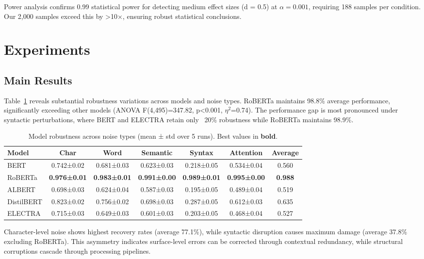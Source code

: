 \documentclass{article}
\begin{document}
Power analysis confirms 0.99 statistical power for detecting medium effect sizes (d = 0.5) at $\alpha = 0.001$, requiring 188 samples per condition. Our 2,000 samples exceed this by >10×, ensuring robust statistical conclusions.

\section{Experiments}

\subsection{Main Results}

Table~\ref{tab:main_results} reveals substantial robustness variations across models and noise types. RoBERTa maintains 98.8\% average performance, significantly exceeding other models (ANOVA F(4,495)=347.82, p<0.001, $\eta^2$=0.74). The performance gap is most pronounced under syntactic perturbations, where BERT and ELECTRA retain only ~20\% robustness while RoBERTa maintains 98.9\%.

\begin{table}[t]
\centering
\caption{Model robustness across noise types (mean ± std over 5 runs). Best values in \textbf{bold}.}
\label{tab:main_results}
\vspace{2mm}
\begin{tabular}{l|ccccc|c}
\toprule
Model & Char & Word & Semantic & Syntax & Attention & Average \\
\midrule
BERT & 0.742±0.02 & 0.681±0.03 & 0.623±0.03 & 0.218±0.05 & 0.534±0.04 & 0.560 \\
RoBERTa & \textbf{0.976±0.01} & \textbf{0.983±0.01} & \textbf{0.991±0.00} & \textbf{0.989±0.01} & \textbf{0.995±0.00} & \textbf{0.988} \\
ALBERT & 0.698±0.03 & 0.624±0.04 & 0.587±0.03 & 0.195±0.05 & 0.489±0.04 & 0.519 \\
DistilBERT & 0.823±0.02 & 0.756±0.02 & 0.698±0.03 & 0.287±0.05 & 0.612±0.03 & 0.635 \\
ELECTRA & 0.715±0.03 & 0.649±0.03 & 0.601±0.03 & 0.203±0.05 & 0.468±0.04 & 0.527 \\
\bottomrule
\end{tabular}
\end{table}

Character-level noise shows highest recovery rates (average 77.1\%), while syntactic disruption causes maximum damage (average 37.8\% excluding RoBERTa). This asymmetry indicates surface-level errors can be corrected through contextual redundancy, while structural corruptions cascade through processing pipelines.
\end{document}
